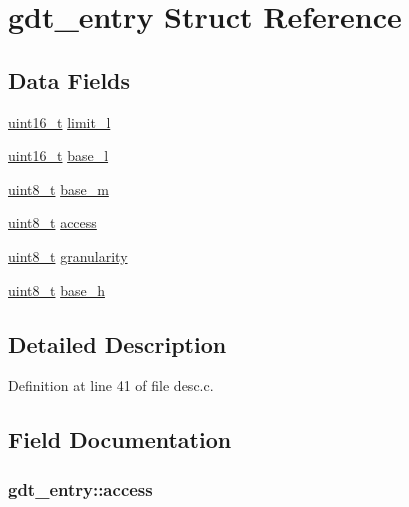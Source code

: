 \hypertarget{structgdt__entry}{\section{gdt\+\_\+entry Struct Reference}
\label{structgdt__entry}
}
\subsection*{Data Fields}
\begin{DoxyCompactItemize}
\item 
\hyperlink{aplus_8h_a5a8b2dc9e45a9ee81a94ef304fb62505}{uint16\+\_\+t} \hyperlink{structgdt__entry_aac421dd71cee241d3c91179d679e477c}{limit\+\_\+l}
\item 
\hyperlink{aplus_8h_a5a8b2dc9e45a9ee81a94ef304fb62505}{uint16\+\_\+t} \hyperlink{structgdt__entry_ae9d195807cdaf9fdfa4d28522b4e6ea6}{base\+\_\+l}
\item 
\hyperlink{aplus_8h_ae0430369c5a35dcdbc0bc19dcbb33a03}{uint8\+\_\+t} \hyperlink{structgdt__entry_a9866fb96bce8b51042b75995a9f5ed4f}{base\+\_\+m}
\item 
\hyperlink{aplus_8h_ae0430369c5a35dcdbc0bc19dcbb33a03}{uint8\+\_\+t} \hyperlink{structgdt__entry_af8f88469b3301c3e777e97b470a97413}{access}
\item 
\hyperlink{aplus_8h_ae0430369c5a35dcdbc0bc19dcbb33a03}{uint8\+\_\+t} \hyperlink{structgdt__entry_accb2a2ef318b0e4fbe2016eb8097947d}{granularity}
\item 
\hyperlink{aplus_8h_ae0430369c5a35dcdbc0bc19dcbb33a03}{uint8\+\_\+t} \hyperlink{structgdt__entry_af64e5321b471da1d5ddf85ff9b0a19d3}{base\+\_\+h}
\end{DoxyCompactItemize}


\subsection{Detailed Description}


Definition at line 41 of file desc.\+c.



\subsection{Field Documentation}
\hypertarget{structgdt__entry_af8f88469b3301c3e777e97b470a97413}{
\subsubsection[{access}]{ gdt\+\_\+entry\+::access}}\label{structgdt__entry_af8f88469b3301c3e777e97b470a97413}


